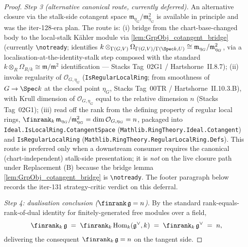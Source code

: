 \begin{proof}
  \emph{Step 3 (alternative canonical route, currently deferred).} An alternative closure via the stalk-side cotangent space \(\mathfrak m_{\eta_G}/\mathfrak m_{\eta_G}^{2}\) is available in principle and was the iter-128-era plan. The route is: (i) bridge from the chart-base-changed body to the local-stalk Kähler module via \cref{lem:GrpObj_cotangent_bridge} (currently \texttt{\textbackslash notready}; identifies \(k \otimes_{\Gamma(G, V)} \Omega_{\Gamma(G, V)/\Gamma(\Spec k, U)} \cong \mathfrak m_{\eta_G}/\mathfrak m_{\eta_G}^{2}\), via a localisation-at-the-identity-stalk step composed with the standard \(k \otimes_{R} \Omega_{R/k} \cong \mathfrak m / \mathfrak m^{2}\) identification — Stacks Tag~02G1 / Hartshorne~II.8.7); (ii) invoke regularity of \(\mathcal O_{G, \eta_G}\) (\texttt{IsRegularLocalRing}; from smoothness of \(G \to \Spec k\) at the closed point \(\eta_G\), Stacks Tag~00TR / Hartshorne~II.10.3.B), with Krull dimension of \(\mathcal O_{G, \eta_G}\) equal to the relative dimension \(n\) (Stacks Tag~02G1); (iii) read off the rank from the defining property of regular local rings, \(\finrank_{k}\,\mathfrak m_{\eta_G}/\mathfrak m_{\eta_G}^{2} = \dim \mathcal O_{G, \eta_G} = n\), packaged into \texttt{Ideal.IsLocalRing.CotangentSpace} (\texttt{Mathlib.RingTheory.Ideal.Cotangent}) and \texttt{IsRegularLocalRing} (\texttt{Mathlib.RingTheory.RegularLocalRing.Defs}). This route is preferred only when a downstream consumer requires the canonical (chart-independent) stalk-side presentation; it is \emph{not} on the live closure path under Replacement (B) because the bridge lemma \cref{lem:GrpObj_cotangent_bridge} is \texttt{\textbackslash notready}. The footer paragraph below records the iter-131 strategy-critic verdict on this deferral.

  \emph{Step 4: dualisation conclusion (\(\finrank\,\mathfrak g = n\)).} By the standard rank-equals-rank-of-dual identity for finitely-generated free modules over a field,
  \[
    \finrank_{k}\,\mathfrak g \;=\; \finrank_{k}\,\mathrm{Hom}_{k}(\mathfrak g^{\vee}, k) \;=\; \finrank_{k}\,\mathfrak g^{\vee} \;=\; n,
  \]
  delivering the consequent \(\finrank_{k}\,\mathfrak g = n\) on the tangent side.


\end{proof}
